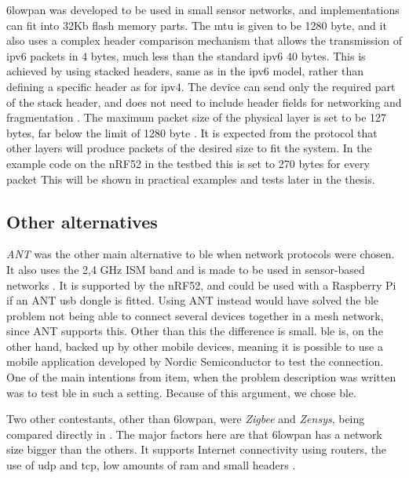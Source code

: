 \noindent \gls{6lowpan} was developed to be used in small sensor networks, and implementations can fit into 32Kb flash memory parts. The \gls{mtu} is given to be 1280 byte, and it also uses a complex header comparison mechanism that allows the transmission of \gls{ipv6} packets in 4 bytes, much less than the standard \gls{ipv6} 40 bytes. This is achieved by using stacked headers, same as in the \gls{ipv6} model, rather than defining a specific header as for \gls{ipv4}. The device can send only the required part of the stack header, and does not need to include header fields for networking and fragmentation \cite{hui2008extending}. The maximum packet size of the physical layer is set to be 127 bytes, far below the limit of 1280 byte \cite{kushalnagar2007transmission}. It is expected from the protocol that other layers will produce packets of the desired size to fit the system. In the example code on the nRF52 in the testbed this is set to 270 bytes for every packet This will be shown in practical examples and tests later in the thesis. 

\subsection{Other alternatives}

\noindent \textit{ANT} was the other main alternative to \gls{ble} when network protocols were chosen. It also uses the 2,4 GHz ISM band and is made to be used in sensor-based networks . It is supported by the \gls{nRF52}, and could be used with a \gls{Raspberry Pi} if an ANT \gls{usb} dongle is fitted. Using ANT instead would have solved the \gls{ble} problem not being able to connect several devices together in a mesh network, since ANT supports this. Other than this the difference is small. \gls{ble} is, on the other hand, backed up by other mobile devices, meaning it is possible to use a mobile application developed by Nordic Semiconductor to test the connection. One of the main intentions from \gls{item}, when the problem description was written was to test \gls{ble} in such a setting. Because of this argument, we chose \gls{ble}. 


\noindent Two other contestants, other than \gls{6lowpan}, were \textit{Zigbee} and \textit{Zensys}, being compared directly in \cite{mulligan20076lowpan}. The major factors here are that \gls{6lowpan} has a network size bigger than the others. It supports Internet connectivity using routers, the use of \gls{udp} and \gls{tcp}, low amounts of \gls{ram} and small headers \cite{mulligan20076lowpan}. 

